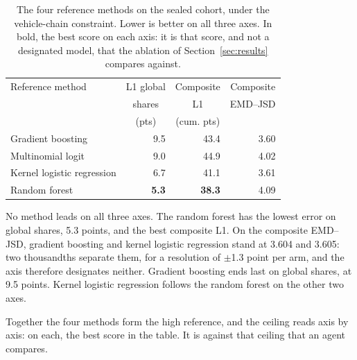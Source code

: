 \begin{table}[tbp]
  \caption{The four reference methods on the sealed cohort, under the vehicle-chain constraint. Lower is better on all three axes. In bold, the best score on each axis: it is that score, and not a designated model, that the ablation of Section~\ref{sec:results} compares against.}
  \label{tab:references}
  \small
  \setlength{\tabcolsep}{4pt}
  \begin{tabular}{@{}lrrr@{}}
    \toprule
    Reference method & \multicolumn{1}{c}{L1 global}
                     & \multicolumn{1}{c}{Composite}
                     & \multicolumn{1}{c}{Composite} \\
                     & \multicolumn{1}{c}{shares}
                     & \multicolumn{1}{c}{L1}
                     & \multicolumn{1}{c}{EMD--JSD} \\
                     & \multicolumn{1}{c}{(pts)}
                     & \multicolumn{1}{c}{(cum. pts)}
                     & \\
    \midrule
    Gradient boosting          & 9.5          & 43.4          & 3.60 \\
    Multinomial logit          & 9.0          & 44.9          & 4.02 \\
    Kernel logistic regression & 6.7          & 41.1          & 3.61 \\
    Random forest              & \textbf{5.3} & \textbf{38.3} & 4.09 \\
    \bottomrule
  \end{tabular}
\end{table}

No method leads on all three axes. The random forest has the lowest error on global shares, 5.3 points, and the best composite L1. On the composite EMD--JSD, gradient boosting and kernel logistic regression stand at 3.604 and 3.605: two thousandths separate them, for a resolution of $\pm$1.3 point per arm, and the axis therefore designates neither. Gradient boosting ends last on global shares, at 9.5 points. Kernel logistic regression follows the random forest on the other two axes.

Together the four methods form the high reference, and the ceiling reads axis by axis: on each, the best score in the table. It is against that ceiling that an agent compares.
